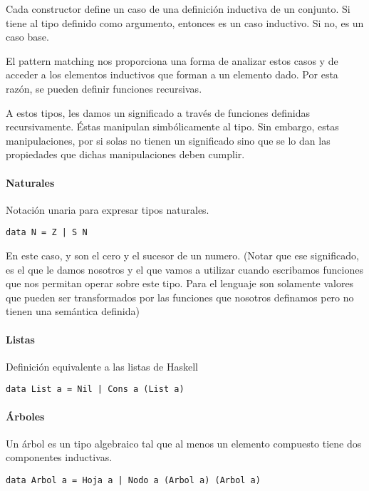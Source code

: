 Cada constructor define un caso de una definición inductiva de un conjunto. Si tiene al tipo definido como argumento, entonces es un caso inductivo. Si no, es un caso base.

El pattern matching nos proporciona una forma de analizar estos casos y de acceder a los elementos inductivos que forman a un elemento dado. Por esta razón, se pueden definir funciones recursivas.

A estos tipos, les damos un significado a través de funciones definidas recursivamente. Éstas manipulan simbólicamente al tipo. Sin embargo, estas manipulaciones, por si solas no tienen un significado sino que se lo dan las propiedades que dichas manipulaciones deben cumplir.

\paragraph{Naturales} Notación unaria para expresar tipos naturales.
\begin{centrado}
	\begin{verbatim}
data N = Z | S N
	\end{verbatim}
\end{centrado}
En este caso,  y  son el cero y el sucesor de un numero. (Notar que ese significado, es el que le damos nosotros y el que vamos a utilizar cuando escribamos funciones que nos permitan operar sobre este tipo. Para el lenguaje son solamente valores que pueden ser transformados por las funciones que nosotros definamos pero no tienen una semántica definida)
\paragraph{Listas} Definición equivalente a las listas de Haskell
\begin{centrado}
	\begin{verbatim}
data List a = Nil | Cons a (List a)
	\end{verbatim}
\end{centrado}

\paragraph{Árboles}
Un árbol es un tipo algebraico tal que al menos un elemento compuesto tiene dos componentes inductivas.

\begin{centrado}
	\begin{verbatim}
data Arbol a = Hoja a | Nodo a (Arbol a) (Arbol a)
	\end{verbatim}
\end{centrado}

